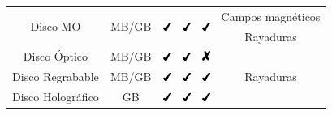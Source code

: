 \begin{table}[H]
{\begin{tabular}{c|c|c|c|c|c}
\hline
\multirow{2}{*}{Disco MO} & \multirow{2}{*}{MB/GB} & \multirow{2}{*}{\includegraphics[keepaspectratio=true, width=10px]{figures/Y}} & \multirow{2}{*}{\includegraphics[keepaspectratio=true, width=10px]{figures/Y}} & \multirow{2}{*}{\includegraphics[keepaspectratio=true, width=10px]{figures/Y}} & Campos magn\'{e}ticos\\
 & & & & & Rayaduras \\
\hline
Disco \'{O}ptico & MB/GB & \includegraphics[keepaspectratio=true, width=10px]{figures/Y} & \includegraphics[keepaspectratio=true, width=10px]{figures/Y} & \includegraphics[keepaspectratio=true, width=10px]{figures/N} & \multirow{3}{*}{Rayaduras} \\
\cline{1-5}
Disco Regrabable & MB/GB & \includegraphics[keepaspectratio=true, width=10px]{figures/Y} & \includegraphics[keepaspectratio=true, width=10px]{figures/Y} & \includegraphics[keepaspectratio=true, width=10px]{figures/Y} &  \\
\cline{1-5}
Disco Hologr\'{a}fico & GB & \includegraphics[keepaspectratio=true, width=10px]{figures/Y} & \includegraphics[keepaspectratio=true, width=10px]{figures/Y} & \includegraphics[keepaspectratio=true, width=10px]{figures/Y} & \\
\end{tabular}
} %
\end{table}

